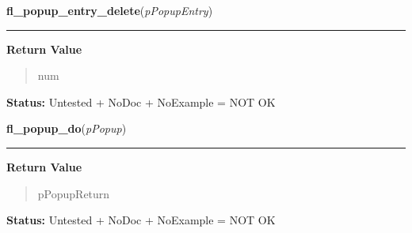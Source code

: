     \vspace{0.5ex}

\hspace{.8\funcindent}\begin{boxedminipage}{\funcwidth}

    \raggedright \textbf{fl\_popup\_entry\_delete}(\textit{pPopupEntry})

    \vspace{-1.5ex}

    \rule{\textwidth}{0.5\fboxrule}
\setlength{\parskip}{2ex}
\setlength{\parskip}{1ex}
      \textbf{Return Value}
    \vspace{-1ex}

      \begin{quote}
      num

      \end{quote}

\textbf{Status:} Untested + NoDoc + NoExample = NOT OK



    \end{boxedminipage}

    \label{xformslib:library:fl_popup_do}

    \vspace{0.5ex}

\hspace{.8\funcindent}\begin{boxedminipage}{\funcwidth}

    \raggedright \textbf{fl\_popup\_do}(\textit{pPopup})

    \vspace{-1.5ex}

    \rule{\textwidth}{0.5\fboxrule}
\setlength{\parskip}{2ex}
\setlength{\parskip}{1ex}
      \textbf{Return Value}
    \vspace{-1ex}

      \begin{quote}
      pPopupReturn

      \end{quote}

\textbf{Status:} Untested + NoDoc + NoExample = NOT OK



    \end{boxedminipage}

    \label{xformslib:library:fl_popup_set_position}

